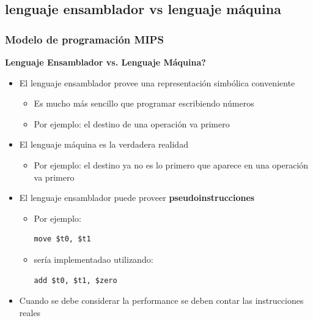 \documentclass[aspectratio=169,compress]{beamer}
\begin{document}
\begin{footnotesize}
\subsection{lenguaje ensamblador vs lenguaje máquina}

\begin{frame}[fragile]
\frametitle{Modelo de programación MIPS}
\begin{center}\textbf{Lenguaje Ensamblador vs. Lenguaje Máquina?}\end{center}

\begin{itemize}
\item El lenguaje ensamblador provee una representación simbólica conveniente
\begin{itemize}
\item Es mucho más sencillo que programar escribiendo números
\item Por ejemplo: el destino de una operación va primero
\end{itemize}
\item El lenguaje máquina es la verdadera realidad
\begin{itemize}
\item Por ejemplo: el destino ya no es lo primero que aparece en una operación va primero
\end{itemize}
\item El lenguaje ensamblador puede proveer \textbf{pseudoinstrucciones}
\begin{itemize}
\item Por ejemplo: \begin{verbatim}move $t0, $t1\end{verbatim}
\item sería implementadao utilizando:  \begin{verbatim}add $t0, $t1, $zero\end{verbatim}
\end{itemize}
\item Cuando se debe considerar la performance se deben contar las instrucciones reales
\end{itemize}
\end{frame}




\end{footnotesize}
\end{document}
